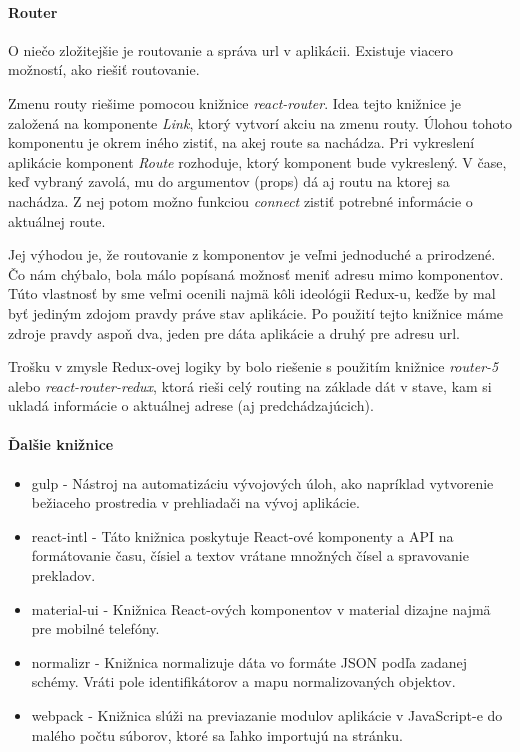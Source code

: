 \paragraph{Router}%
O niečo zložitejšie je routovanie a správa url v aplikácii. Existuje viacero možností, ako riešiť routovanie. 

Zmenu routy riešime pomocou knižnice \emph{react-router}. %
Idea tejto knižnice je založená na komponente \emph{Link}, ktorý vytvorí akciu na zmenu routy. Úlohou tohoto komponentu je okrem iného zistiť, na akej route sa nachádza. 
Pri vykreslení aplikácie komponent \emph{Route} rozhoduje, ktorý komponent bude vykreslený. %
V čase, keď vybraný zavolá, mu do argumentov (props)
dá aj routu na ktorej sa nachádza. Z nej potom možno funkciou \emph{connect} zistiť potrebné informácie o aktuálnej route. %

Jej výhodou je, že routovanie z komponentov je veľmi jednoduché a prirodzené. Čo nám chýbalo, bola málo popísaná možnosť meniť adresu mimo komponentov. Túto vlastnosť by sme veľmi ocenili najmä kôli ideológii Redux-u, keďže by mal byť jediným zdojom pravdy práve stav aplikácie. Po použití tejto knižnice máme zdroje pravdy aspoň dva, jeden pre dáta aplikácie a druhý pre adresu url. 


Trošku  v zmysle Redux-ovej logiky by bolo riešenie s použitím knižnice \emph{router-5} alebo \emph{react-router-redux}, ktorá rieši celý routing na základe dát v stave, kam si ukladá informácie o aktuálnej adrese (aj predchádzajúcich).

\paragraph{Ďalšie knižnice}
\begin{itemize}
  \item gulp \cite{gulp} - Nástroj na automatizáciu vývojových úloh, ako napríklad vytvorenie bežiaceho prostredia v prehliadači na vývoj aplikácie.
  \item react-intl \cite{intl} - Táto knižnica poskytuje React-ové komponenty a API na formátovanie času, čísiel a textov vrátane množných čísel a spravovanie prekladov.
  \item material-ui \cite{material-ui} - Knižnica React-ových komponentov v material dizajne najmä pre mobilné telefóny. %
  \item normalizr \cite{normalizr} - Knižnica normalizuje dáta vo formáte JSON podľa zadanej schémy. Vráti pole identifikátorov a mapu normalizovaných objektov.
  \item webpack \cite{webpack} - Knižnica slúži na previazanie modulov aplikácie v JavaScript-e do malého počtu súborov, ktoré sa ľahko importujú na stránku.
\end{itemize}